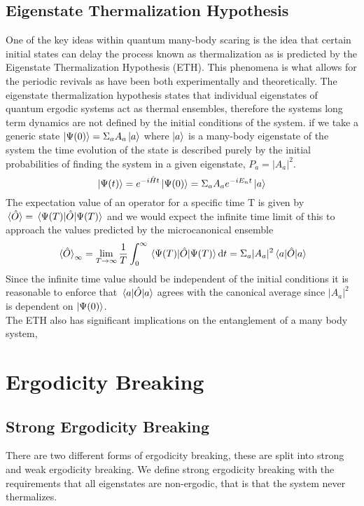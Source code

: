 \subsection{Eigenstate Thermalization Hypothesis}
One of the key ideas within quantum many-body scaring is the idea that certain initial states can delay the process known as thermalization as is predicted by the Eigenstate Thermalization Hypothesis (ETH)\citep{srednicki_chaos_1994}. This phenomena is what allows for the periodic revivals as have been both experimentally and theoretically. The eigenstate thermalization hypothesis states that individual eigenstates of quantum ergodic systems act as thermal ensembles, therefore the systems long term dynamics are not defined by the initial conditions of the system. if we take a generic state $\ket{\Psi(0)} = \Sigma_a A_a \ket{a}$ where $\ket{a}$ is a many-body eigenstate of the system the time evolution of the state is described purely by the initial probabilities of finding the system in a given eigenstate, $P_a = |A_a|^2$.
\begin{equation}
  \ket{\Psi (t)} = e ^{-i\hat{H}t}\ket{\Psi(0)} = \Sigma_a A_ae^{-iE_nt}\ket{a}
\end{equation}  
The expectation value of an operator for a specific time T is given by $\expval*{\hat{O}} = \expval*{\hat{O}}{\Psi(T)}$ and we would expect the infinite time limit of this to approach the values predicted by the microcanonical ensemble
\begin{equation}
\expval*{\hat{O}}_\infty
= \lim_{T\rightarrow \infty} \frac{1}{T} \int_0^\infty \expval*{\hat{O}}{\Psi(T)} \dd t = \Sigma_a |A_a|^2\expval*{\hat{O}}{a}
\end{equation}
Since the infinite time value should be independent of the initial conditions it is reasonable to enforce that $\expval*{\hat{O}}{a}$ agrees with the canonical average since $|A_a|^2$ is dependent on $\ket{\Psi(0)}$. \citep{Abanin2019}
\\
The ETH also has significant implications on the entanglement of a many body system, 

\section{Ergodicity Breaking}
\subsection{Strong Ergodicity Breaking}
There are two different forms of ergodicity breaking, these are split into strong and weak ergodicity breaking. We define strong ergodicity breaking with the requirements that all eigenstates are non-ergodic, that is that the system never thermalizes.
